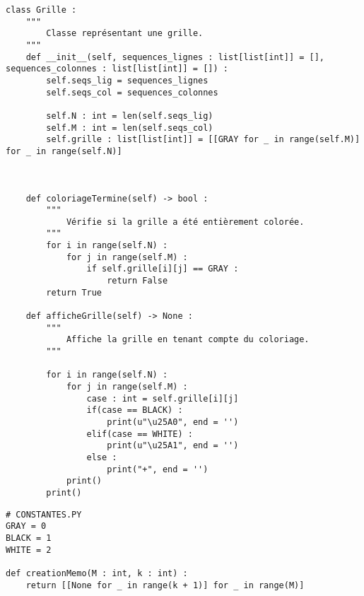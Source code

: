 \documentclass[a4paper,12pt]{article}
\begin{document}
\newpage

\begin{lstlisting}
class Grille :
    """
        Classe représentant une grille.
    """
    def __init__(self, sequences_lignes : list[list[int]] = [], sequences_colonnes : list[list[int]] = []) :
        self.seqs_lig = sequences_lignes
        self.seqs_col = sequences_colonnes
        
        self.N : int = len(self.seqs_lig)
        self.M : int = len(self.seqs_col)
        self.grille : list[list[int]] = [[GRAY for _ in range(self.M)] for _ in range(self.N)]
        
        
    
    def coloriageTermine(self) -> bool :
        """
            Vérifie si la grille a été entièrement colorée.
        """
        for i in range(self.N) :
            for j in range(self.M) :
                if self.grille[i][j] == GRAY :
                    return False
        return True
    
    def afficheGrille(self) -> None :
        """
            Affiche la grille en tenant compte du coloriage.
        """

        for i in range(self.N) :
            for j in range(self.M) :
                case : int = self.grille[i][j]
                if(case == BLACK) :
                    print(u"\u25A0", end = '')
                elif(case == WHITE) :
                    print(u"\u25A1", end = '')  
                else :
                    print("+", end = '')
            print()
        print()
\end{lstlisting}

\begin{lstlisting}
# CONSTANTES.PY
GRAY = 0
BLACK = 1
WHITE = 2

def creationMemo(M : int, k : int) :
    return [[None for _ in range(k + 1)] for _ in range(M)]
\end{lstlisting}

\newpage
\end{document}
